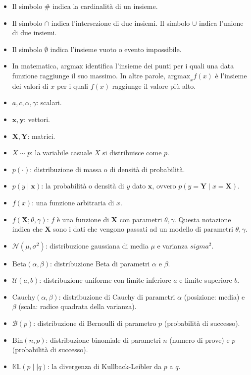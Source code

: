 \documentclass[
  11pt,
]{krantz}
\theoremstyle{definition}
\theoremstyle{definition}
\theoremstyle{definition}
\theoremstyle{definition}
\theoremstyle{remark}
\begin{document}
\begin{itemize}
\item
  Il simbolo \(\#\) indica la cardinalità di un insieme.
\item
  Il simbolo \(\cap\) indica l'intersezione di due insiemi. Il simbolo \(\cup\) indica l'unione di due insiemi.
\item
  Il simbolo \(\emptyset\) indica l'insieme vuoto o evento impossibile.
\item
  In matematica, \(\mbox{argmax}\) identifica l'insieme dei punti per i quali una data funzione raggiunge il suo massimo. In altre parole, \(\mbox{argmax}_x f(x)\) è l'insieme dei valori di \(x\) per i quali \(f(x)\) raggiunge il valore più alto.
\item
  \(a, c, \alpha, \gamma\): scalari.
\item
  \(\boldsymbol{x}, \boldsymbol{y}\): vettori.
\item
  \(\boldsymbol{X}, \boldsymbol{Y}\): matrici.
\item
  \(X \sim p\): la variabile casuale \(X\) si distribuisce come \(p\).
\item
  \(p(\cdot)\): distribuzione di massa o di densità di probabilità.
\item
  \(p(y \mid \boldsymbol{x})\): la probabilità o densità di \(y\) dato \(\boldsymbol{x}\), ovvero \(p(y = \boldsymbol{Y} \mid x = \boldsymbol{X})\).
\item
  \(f(x)\): una funzione arbitraria di \(x\).
\item
  \(f(\boldsymbol{X}; \theta, \gamma)\): \(f\) è una funzione di \(\boldsymbol{X}\) con parametri \(\theta, \gamma\). Questa notazione indica che \(\boldsymbol{X}\) sono i dati che vengono passati ad un modello di parametri \(\theta, \gamma\).
\item
  \(\mathcal{N}(\mu, \sigma^2)\): distribuzione gaussiana di media \(\mu\) e varianza \(sigma^2\).
\item
  \(\mbox{Beta}(\alpha, \beta)\): distribuzione Beta di parametri \(\alpha\) e \(\beta\).
\item
  \(\mathcal{U}(a, b)\): distribuzione uniforme con limite inferiore \(a\) e limite superiore \(b\).
\item
  \(\mbox{Cauchy}(\alpha, \beta)\): distribuzione di Cauchy di parametri \(\alpha\) (posizione: media) e \(\beta\) (scala: radice quadrata della varianza).
\item
  \(\mathcal{B}(p)\): distribuzione di Bernoulli di parametro \(p\) (probabilità di successo).
\item
  \(\mbox{Bin}(n, p)\): distribuzione binomiale di parametri \(n\) (numero di prove) e \(p\) (probabilità di successo).
\item
  \(\mathbb{KL} (p \mid\mid q)\): la divergenza di Kullback-Leibler da \(p\) a \(q\).
\end{itemize}

  

\printindex
\end{document}
